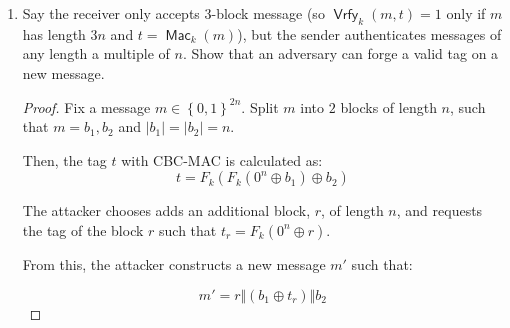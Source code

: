 \documentclass{article}
\DeclareMathOperator{\Mac}{\textsf{Mac}}
\DeclareMathOperator{\Vrfy}{\textsf{Vrfy}}
\begin{document}
\begin{enumerate}
\begin{enumerate}
\begin{proof}
          Using CBC-MAC, the sender calculates a tag $t$ for the message $m$:

          \[  
            t = F_k(F_k(0^n \oplus b_1) \oplus b_2)
          \]

          Then, the attacker creates a message $m'$ from the blocks of $m$ so
          that

          \[
            m' = b_1, b_2, t \oplus b_1, b_2
          \]

          With this, the tag for the message $m'$ is calculated as the
          following:


          \begin{align*}
            t' &= F_k(F_k(F_k(F_k(0^n \oplus b_1) \oplus b_2) \oplus (t \oplus
            b_1)) \oplus b_2)\\
            &= F_k(F_k(t \oplus (t \oplus b_1)) \oplus b_2)\\
            &= F_k(F_k(0^n \oplus b_1) \oplus b_2)\\
            t' &= t
          \end{align*}

          Thus, we find a different message $m'$ that has the same tag $t$, and
          we have successfully forged a previously unknown tag.
        \end{proof}

      \item Say the receiver only accepts 3-block message (so $\Vrfy_k(m, t) =
        1$ only if $m$ has length $3n$ and $t = \Mac_k(m)$), but the sender
        authenticates messages of any length a multiple of $n$. Show that an
        adversary can forge a valid tag on a new message.

        \begin{proof}
          Fix a message $m \in \left\{0, 1\right\}^{2n}$. Split $m$ into $2$
          blocks of length $n$, such that $m = b_1, b_2$ and $|b_1| = |b_2| =
          n$.

          Then, the tag $t$ with CBC-MAC is calculated as:
          \[
            t = F_k(F_k(0^n \oplus b_1) \oplus b_2)
          \]

          The attacker chooses adds an additional block, $r$, of length $n$, and
          requests the tag of the block $r$ such that $t_r = F_k(0^n \oplus r)$.

          From this, the attacker constructs a new message $m'$ such that:

          \[
            m' = r \Vert (b_1 \oplus t_r) \Vert b_2
          \]


\end{proof}
\end{enumerate}
\end{enumerate}
\end{document}
